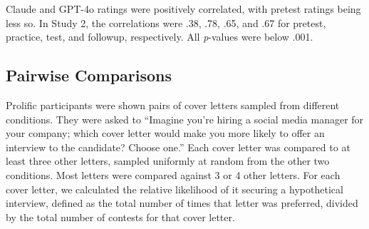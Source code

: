 \documentclass[11pt]{report}
\begin{document}
\begin{append}
Claude and GPT-4o ratings were positively correlated, with pretest ratings being less so. In Study 2, the correlations were .38, .78, .65, and .67 for pretest, practice, test, and followup, respectively. All \textit{p}-values were below .001.

\subsection{Pairwise Comparisons}
Prolific participants were shown pairs of cover letters sampled from different conditions. 
They were asked to ``Imagine you’re hiring a social media manager for your company; which cover letter would make you more likely to offer an interview to the candidate? Choose one.''
Each cover letter was compared to at least three other letters, sampled uniformly at random from the other two conditions. 
Most letters were compared against 3 or 4 other letters.
For each cover letter, we calculated the relative likelihood of it securing a hypothetical interview, defined as the total number of times that letter was preferred, divided by the total number of contests for that cover letter.






\end{append}
\end{document}
